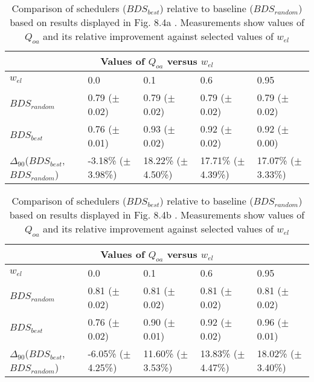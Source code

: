 \clearpage
\begin{landscape}
\begin{table}[h]
\begin{center}
\begin{tabular}{lllll}
\toprule
\multicolumn{5}{c}{Values of $Q_{oa}$ versus $w_{el}$}\\
\midrule
$w_{el}$ & 0.0 & 0.1 & 0.6 & 0.95\\
\midrule
$BDS_{random}$ &  0.79 ($\pm$0.02) &  0.79 ($\pm$0.02) &  0.79 ($\pm$0.02) &  0.79 ($\pm$0.02)\\
\midrule
$BDS_{best}$ &  0.76 ($\pm$0.01) &  0.93 ($\pm$0.02) &  0.92 ($\pm$0.02) &  0.92 ($\pm$0.00)\\
$\Delta_{90}$($BDS_{best}$,$BDS_{random}$) & -3.18\% ($\pm$3.98\%) & 18.22\% ($\pm$4.50\%) & 17.71\% ($\pm$4.39\%) & 17.07\% ($\pm$3.33\%)\\
\bottomrule
\end{tabular}
\end{center}
\caption[Comparison of $Q_{oa}$ versus $w_{el}$ for $BDS_{best}$ relative to $BDS_{random}$.]{Comparison of schedulers ($BDS_{best}$) relative to baseline ($BDS_{random}$) based on results displayed in Fig. 8.4a . Measurements show values of $Q_{oa}$ and its relative improvement against selected values of $w_{el}$}
\label{b:f84a}
\end{table}
\end{landscape}


\clearpage
\begin{landscape}
\begin{table}[h]
\begin{center}
\begin{tabular}{lllll}
\toprule
\multicolumn{5}{c}{Values of $Q_{oa}$ versus $w_{el}$}\\
\midrule
$w_{el}$ & 0.0 & 0.1 & 0.6 & 0.95\\
\midrule
$BDS_{random}$ &  0.81 ($\pm$0.02) &  0.81 ($\pm$0.02) &  0.81 ($\pm$0.02) &  0.81 ($\pm$0.02)\\
\midrule
$BDS_{best}$ &  0.76 ($\pm$0.02) &  0.90 ($\pm$0.01) &  0.92 ($\pm$0.02) &  0.96 ($\pm$0.01)\\
$\Delta_{90}$($BDS_{best}$,$BDS_{random}$) & -6.05\% ($\pm$4.25\%) & 11.60\% ($\pm$3.53\%) & 13.83\% ($\pm$4.47\%) & 18.02\% ($\pm$3.40\%)\\
\bottomrule
\end{tabular}
\end{center}
\caption[Comparison of $Q_{oa}$ versus $w_{el}$ for $BDS_{best}$ relative to $BDS_{random}$.]{Comparison of schedulers ($BDS_{best}$) relative to baseline ($BDS_{random}$) based on results displayed in Fig. 8.4b . Measurements show values of $Q_{oa}$ and its relative improvement against selected values of $w_{el}$}
\label{b:f84b}
\end{table}
\end{landscape}


